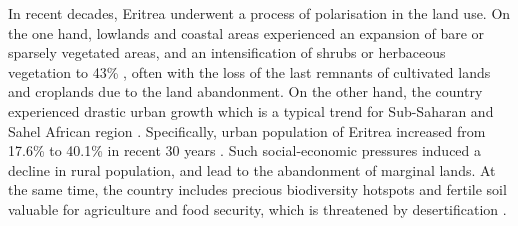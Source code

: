 \documentclass[sn-mathphys-num]{sn-jnl}%
\theoremstyle{thmstyleone}%
\theoremstyle{thmstyletwo}%
\theoremstyle{thmstylethree}%
\begin{document}
{{In recent decades, Eritrea underwent a process of polarisation in the land use. On the one hand, lowlands and coastal areas experienced an expansion of bare or sparsely vegetated areas, and an intensification of shrubs or herbaceous vegetation to 43\%} \cite{Adem}, {often with the loss of the last remnants of cultivated lands and croplands due to the land abandonment. On the other hand, the country experienced drastic urban growth which is a typical trend for Sub-Saharan and Sahel African region} \cite{SUN2024141443,SULEMANA2019101544}{. Specifically, urban population of Eritrea increased from 17.6\% to 40.1\% in recent 30 years} \cite{Esmail}. {Such social-economic pressures induced a decline in rural population, and lead to the abandonment of marginal lands. At the same time, the country includes precious biodiversity hotspots and fertile soil valuable for agriculture and food security, which is threatened by desertification} \cite{VALE202057,ANGULOPRECKLER2024e03339}. 

}
\end{document}
